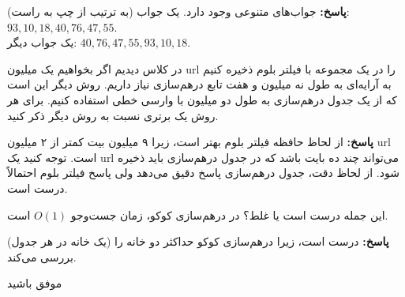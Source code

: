 \documentclass[12pt, a4paper]{article}
\newcommand{\vsp}{\vspace{25pt}}
\newcommand{\پاسخ}[2]{\color{answercolor}\textbf{پاسخ: }#2\color{black}\vspace{-0.3cm}}
\begin{document}
\پاسخ{\vsp\vsp}{جواب‌های متنوعی وجود دارد.
	یک جواب (به ترتیب از چپ به راست): 
$93, 10, 18, 40, 76, 47, 55$.\\
یک جواب دیگر:
$40, 76, 47, 55, 93, 10, 18$.
	
}

در کلاس دیدیم اگر بخواهیم یک میلیون url را در یک مجموعه با فیلتر بلوم ذخیره کنیم به آرایه‌ای به طول نه میلیون و هفت تابع درهم‌سازی نیاز داریم. روش دیگر این است که از یک جدول درهم‌سازی به طول دو میلیون با وارسی خطی استفاده کنیم. برای هر روش یک برتری نسبت به روش دیگر ذکر کنید.

\پاسخ{\vsp\vsp}{
از لحاظ حافظه فیلتر بلوم بهتر است، زیرا ۹ میلیون بیت کمتر از ۲ میلیون url است. توجه کنید یک url می‌تواند چند ده بایت باشد که در جدول درهم‌سازی باید ذخیره شود. از لحاظ دقت، جدول درهم‌سازی پاسخ دقیق می‌دهد ولی پاسخ فیلتر بلوم احتمالاً درست است.
	
}

این جمله درست است یا غلط؟ در درهم‌سازی کوکو، زمان جست‌وجو  $O(1)$ است.

\پاسخ{\vsp\vsp}{
درست است، زیرا درهم‌سازی کوکو حداکثر دو خانه را  (یک خانه در هر جدول) بررسی می‌کند.
	
}
\vspace{1pt}
\begin{flushleft}
موفق باشید
\end{flushleft}
\end{document}
